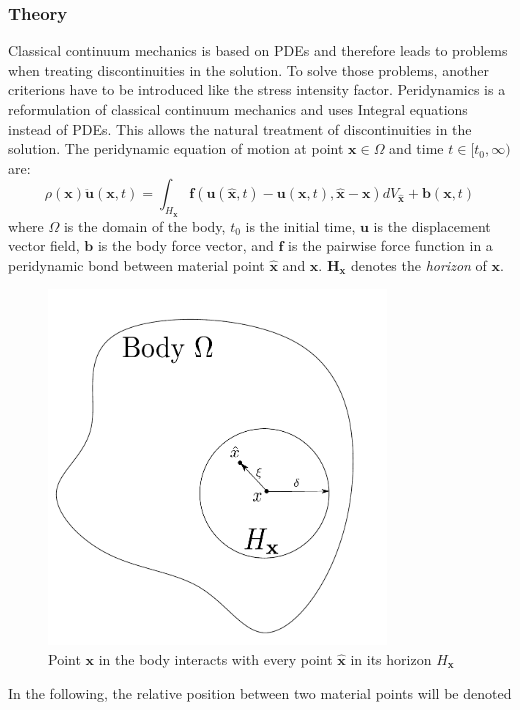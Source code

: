 \subsubsection{Theory}
Classical continuum mechanics is based on PDEs and therefore leads to problems when treating discontinuities in the solution. To solve those problems, another criterions have to be introduced like the stress intensity factor. Peridynamics is a reformulation of classical continuum mechanics and uses Integral equations instead of PDEs. This allows the natural treatment of discontinuities in the solution.
The peridynamic equation of motion at point $\bm{x}\in \Omega$ and time $t\in
[t_0,\infty)$ are:
\begin{equation}
\rho(\bm{x})\ddot{\bm{u}}(\bm{x},t)=\int_{H_{\bm{x}}} \bm{f}(\bm{u}(\hat{\bm{x}},t)-\bm{u}(\bm{x},t),\hat{\bm{x}}-\bm{x})dV_{\hat{\bm{x}}}+\bm{b}(\bm{x},t)
\end{equation}
where $\Omega$ is the domain of the body, $t_0$ is the initial time, $\bm{u}$ is the displacement vector field, $\bm{b}$ is the body force vector, and $\bm{f}$ is the pairwise force function in a peridynamic bond between material point $\bm{\hat{x}}$ and $\bm{x}$. $\bm{H_x}$ denotes the \textit{horizon} of $\bm{x}$.
\begin{figure}
	\centering
	\includegraphics[width=0.8\textwidth]{figures/peridynamic}
	\caption{Point $\bm{x}$ in the body interacts with every point $\bm{\hat{x}}$ in its horizon $H_{\bm{x}}$}
\end{figure}
In the following, the relative position between two material points will be denoted 
